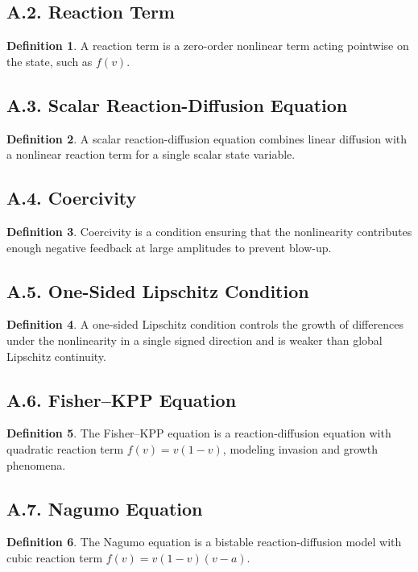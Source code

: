 \documentclass[11pt]{article}
\theoremstyle{definition}
\newtheorem{definition}{Definition}
\theoremstyle{remark}
\begin{document}
\subsection*{A.2. Reaction Term}
\begin{definition}
A reaction term is a zero-order nonlinear term acting pointwise on the state, such as \(f(v)\).
\end{definition}

\subsection*{A.3. Scalar Reaction-Diffusion Equation}
\begin{definition}
A scalar reaction-diffusion equation combines linear diffusion with a nonlinear reaction term for a single scalar state variable.
\end{definition}

\subsection*{A.4. Coercivity}
\begin{definition}
Coercivity is a condition ensuring that the nonlinearity contributes enough negative feedback at large amplitudes to prevent blow-up.
\end{definition}

\subsection*{A.5. One-Sided Lipschitz Condition}
\begin{definition}
A one-sided Lipschitz condition controls the growth of differences under the nonlinearity in a single signed direction and is weaker than global Lipschitz continuity.
\end{definition}

\subsection*{A.6. Fisher--KPP Equation}
\begin{definition}
The Fisher--KPP equation is a reaction-diffusion equation with quadratic reaction term \(f(v)=v(1-v)\), modeling invasion and growth phenomena.
\end{definition}

\subsection*{A.7. Nagumo Equation}
\begin{definition}
The Nagumo equation is a bistable reaction-diffusion model with cubic reaction term \(f(v)=v(1-v)(v-a)\).
\end{definition}
\end{document}
